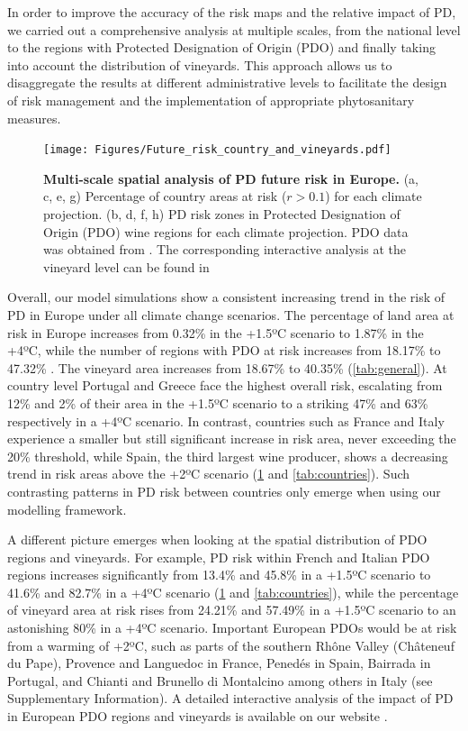 In order to improve the accuracy of the risk maps and the  relative impact
of PD, we carried out a comprehensive analysis at multiple scales, from the
national level to the regions with Protected Designation of Origin (PDO) and
finally taking into account the distribution of vineyards. This approach allows
us to disaggregate the results at different administrative levels to facilitate
the design of risk management and the implementation of appropriate
phytosanitary measures.

\begin{figure}[t!]
    \centering

    \texttt{[image: Figures/Future\_risk\_country\_and\_vineyards.pdf]}
    \caption[Multi-scale spatial analysis of PD future risk in
        Europe]{\textbf{Multi-scale spatial analysis of PD future risk in
            Europe.} (a, c, e, g) Percentage of country areas at risk ($r>0.1$)
        for each
        climate projection. (b, d, f, h) PD risk zones in Protected Designation
        of
        Origin (PDO) wine regions for each climate projection. PDO data was
        obtained
        from \cite{Candiago2022}. The corresponding interactive analysis at the
        vineyard level can be found in \cite{Webpage}}
    \label{fig:vineyards}
\end{figure}

Overall, our model simulations show a consistent
increasing trend in the risk of PD in Europe under all climate change
scenarios. The percentage of land area at risk in Europe increases from 0.32\%
in the +1.5ºC scenario to 1.87\% in the +4ºC, while the number of regions with
PDO at risk increases from 18.17\% to 47.32\% . The vineyard area  increases
from 18.67\% to 40.35\% (\cref{tab:general}). At country level
Portugal and
Greece face the highest overall risk, escalating from 12\% and 2\% of their
area  in the +1.5ºC scenario to a striking 47\% and 63\%  respectively in a
+4ºC scenario. In contrast, countries such as France and Italy experience a
smaller but still significant increase in risk area, never exceeding the 20\%
threshold, while Spain, the third largest wine producer, shows a decreasing
trend in risk areas above the +2ºC scenario (\cref{fig:vineyards} and
\cref{tab:countries}). Such contrasting patterns in PD risk between
countries
only emerge when using our modelling framework.

A different picture emerges when looking at the spatial distribution of PDO
regions and vineyards. For example, PD risk within French and Italian PDO
regions increases significantly from 13.4\% and 45.8\% in a +1.5ºC scenario to
41.6\% and 82.7\% in a +4ºC scenario (\cref{fig:vineyards} and
\cref{tab:countries}), while the percentage of vineyard area at
risk rises
from 24.21\% and 57.49\% in a +1.5ºC scenario to an astonishing 80\% in a +4ºC
scenario. Important European PDOs would be at risk from a warming of  +2ºC,
such as parts of the southern Rhône Valley (Châteneuf du Pape), Provence and
Languedoc in France, Penedés in Spain, Bairrada in Portugal, and Chianti and
Brunello di Montalcino among others in Italy (see Supplementary Information). A
detailed interactive analysis of the impact of PD in European PDO regions and
vineyards is available on our website \cite{Webpage}.


